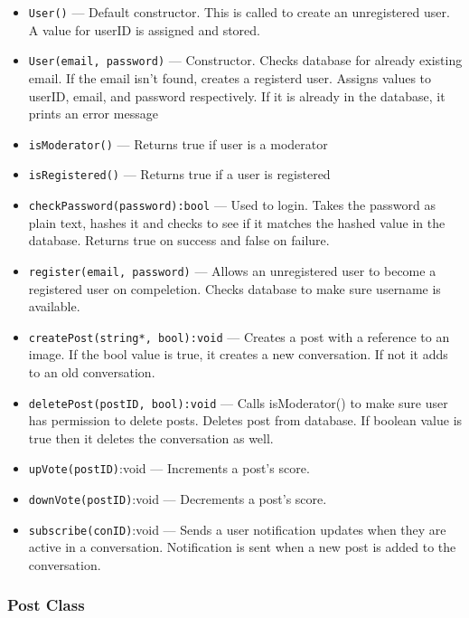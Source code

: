 \documentclass[11pt]{scrartcl}
\begin{document}
            \begin{itemize}
                \item \texttt{User()} --- Default constructor. This is called to create an unregistered user.  A value for userID is assigned and stored.
                \item \texttt{User(email, password)} --- Constructor. Checks database for already existing email. If the email isn't found, creates a registerd user. Assigns values to userID, email, and password respectively. If it is already in the database, it prints an error message
                \item \texttt{isModerator()} --- Returns true if user is a moderator
                \item \texttt{isRegistered()} --- Returns true if a user is registered
                \item \texttt{checkPassword(password):bool} --- Used to login. Takes the password as plain text, hashes it and checks to see if it matches the hashed value in the database.  Returns true on success and false on failure.
                \item \texttt{register(email, password)} --- Allows an unregistered user to become a registered user on compeletion. Checks database to make sure username is available.
                \item \texttt{createPost(string*, bool):void} --- Creates a post with a reference to an image.  If the bool value is true, it creates a new conversation. If not it adds to an old conversation.
                \item \texttt{deletePost(postID, bool):void} --- Calls isModerator() to make sure user has permission to delete posts. Deletes post from database. If boolean value is true then it deletes the conversation as well.
                \item \texttt{upVote(postID)}:void --- Increments a post's score.
                \item \texttt{downVote(postID)}:void --- Decrements a post's score.
                \item \texttt{subscribe(conID)}:void --- Sends a user notification updates when they are active in a conversation.  Notification is sent when a new post is added to the conversation.
            \end{itemize}

        \subsubsection{Post Class}
\end{document}
